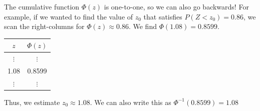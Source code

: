 \documentclass[12pt,letterpaper]{article}
\begin{document}
\begin{enumerate}[resume,itemsep=50pt]
\begin{multicols}{2}
\item {}
\item {}

\end{multicols}
\end{enumerate}


\newpage
The cumulative function $\Phi(z)$ is one-to-one, so we can also go backwards! For example, if we wanted to find the value of $z_0$ that satisfies $P(Z<z_0) = 0.86$, we scan the right-columns for $\Phi(z)\approx 0.86$. We find $\Phi(1.08) = 0.8599$.
\begin{center}
\begin{tabular}{|c|c|}\hline
$z$ & $\Phi(z)$ \\ \hline
$\vdots$ & $\vdots$ \\
1.08 & 0.8599 \\
$\vdots$ & $\vdots$ \\ \hline
\end{tabular}
\end{center}
Thus, we estimate $z_0\approx 1.08$. We can also write this as $\Phi^{-1}(0.8599)=1.08$
\end{document}
